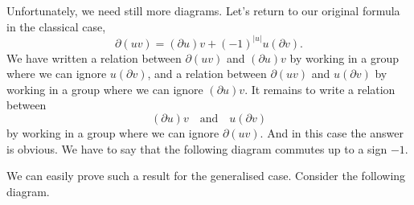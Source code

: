 \documentclass[../main]{subfiles}
\begin{document}
Unfortunately, we need still more diagrams. Let's return to our original formula in the classical case, $$\partial(uv) = (\partial u) v + (-1)^{|u|} u(\partial v).$$ We have written a relation between $\partial(uv)$ and $(\partial u) v$ by working in a group where we can ignore $u(\partial v)$, and a relation between $\partial(uv)$ and $u(\partial v)$ by working in a group where we can ignore $(\partial u)v$. It remains to write a relation between $$(\partial u) v \quad \text {and} \quad u(\partial v)$$ by working in a group where we can ignore $\partial(uv)$. And in this case the answer is obvious. We have to say that the following diagram commutes up to a sign $-1$. 

 {
}

We can easily prove such a result for the generalised case. Consider the following diagram. 
\end{document}
